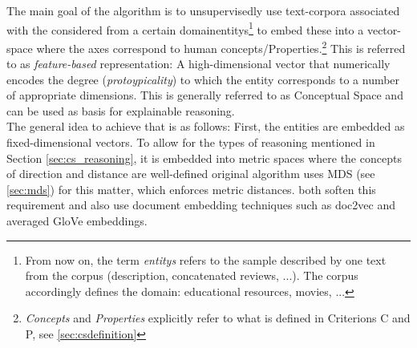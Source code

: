 
The main goal of the algorithm is to unsupervisedly use text-corpora associated with the considered from a certain domain\glspl{entity}\footnote{From now on, the term \textit{\glspl{entity}} refers to the sample described by one text from the corpus (description, concatenated reviews, ...). The corpus accordingly defines the domain: educational resources, movies, ...} to embed these into a vector-space where the axes correspond to human concepts/Properties.\footnote{\textit{Concepts} and \textit{Properties} explicitly refer to what is defined in Criterions C and P, see \ref{sec:csdefinition}} This is referred to as \textit{feature-based} representation: A high-dimensional vector that numerically encodes the degree (\textit{protoypicality}) to which the entity corresponds to a number of appropriate dimensions. This is generally referred to as Conceptual Space and can be used as basis for explainable reasoning.\\

The general idea to achieve that is as follows: First, the entities are embedded as fixed-dimensional vectors. To allow for the types of reasoning mentioned in Section \ref{sec:cs_reasoning}, it is embedded into metric spaces where the concepts of direction and distance are well-defined  original algorithm uses MDS (see \ref{sec:mds}) for this matter, which enforces metric distances. \cite{Ager2018,Alshaikh2020} both soften this requirement and also use document embedding techniques such as doc2vec and averaged GloVe  embeddings.

